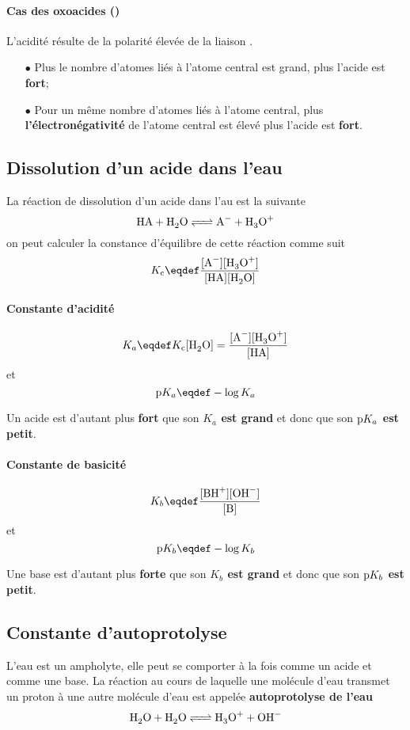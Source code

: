 \paragraph{Cas des oxoacides ()}
L'acidité résulte de la polarité élevée de la liaison .
\begin{itemize}
  \item[$\bullet$] Plus le nombre d'atomes \textbf{}
    liés à l'atome central est grand, plus l'acide est \textbf{fort};
  \item[$\bullet$] Pour un même nombre d'atomes  liés à l'atome central,
    plus \textbf{l'électronégativité} de l'atome
    central est élevé plus l'acide est \textbf{fort}.
\end{itemize}

\subsection{Dissolution d'un acide dans l'eau}
La réaction de dissolution d'un acide dans l'au est la suivante
\[ \ce{HA + H2O <=> A- + H3O+} \]
on peut calculer la constance d'équilibre de cette réaction comme suit
\[ \kc\eqdef\frac{[\ce{A-}][\ce{H3O+}]}{[\ce{HA}][\ce{H2O}]} \]

\paragraph{Constante d'acidité}
\[ K_a\eqdef\kc[\ce{H2O}]=\frac{[\ce{A-}][\ce{H3O+}]}{[\ce{HA}]} \]
et
\[ \pka\eqdef-\log{K_a} \]

Un acide est d'autant plus \textbf{fort} que son \textbf{$K_a$ est grand} et donc que son \textbf{$\mathrm{p}K_a$ est petit}.\\

\paragraph{Constante de basicité}
\[ K_b\eqdef\frac{[\ce{BH+}][\ce{OH-}]}{[\ce{B}]} \]
et
\[ \pkb\eqdef-\log{K_b} \]

Une base est d'autant plus \textbf{forte} que son \textbf{$K_b$ est grand} et donc que son \textbf{$\mathrm{p}K_b$ est petit}.\\

\subsection{Constante d'autoprotolyse}
L'eau est un \textrm{ampholyte},
elle peut se comporter à la fois comme un acide et comme une base.
La réaction au cours de laquelle une molécule d'eau transmet un proton à une autre molécule d'eau est appelée \textbf{autoprotolyse de l'eau}
\[\ce{H2O + H2O <=> H3O+ + OH-}\]

